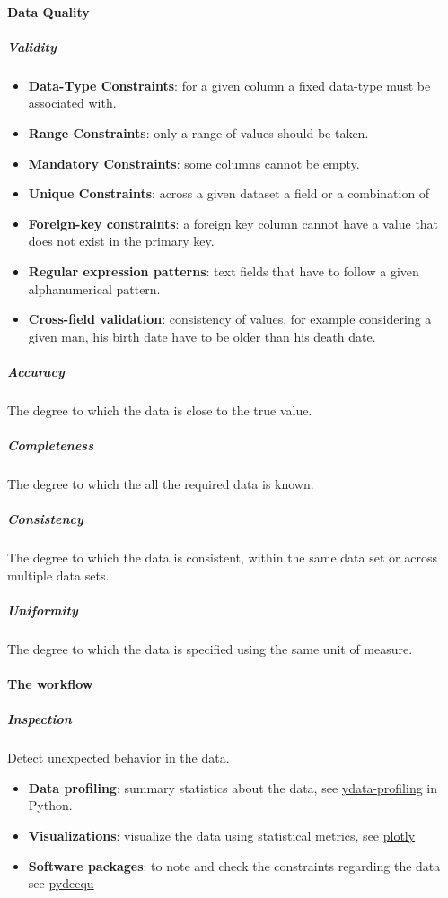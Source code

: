 \paragraph{Data Quality} 
\subparagraph{Validity}
\begin{itemize}
    \item \textbf{Data-Type Constraints}: for a given column a fixed data-type must be associated with.
    \item \textbf{Range Constraints}: only a range of values should be taken.
    \item \textbf{Mandatory Constraints}: some columns cannot be empty.
    \item \textbf{Unique Constraints}: across a given dataset a field or a combination of
    \item \textbf{Foreign-key constraints}: a foreign key column cannot have a value that
        does not exist in the primary key.
    \item \textbf{Regular expression patterns}: text fields that have to follow a given 
        alphanumerical pattern.
    \item \textbf{Cross-field validation}: consistency of values, for example considering
        a given man, his birth date have to be older than his death date.
\end{itemize}

\subparagraph{Accuracy}
The degree to which the data is close to the true value.
\cite{omar_elgabry_the_ultimate_guide_to_data_cleaning}

\subparagraph{Completeness}
The degree to which the all the required data is known.

\subparagraph{Consistency}
The degree to which the data is consistent, within the same data set or across multiple 
data sets.

\subparagraph{Uniformity}
The degree to which the data is specified using the same unit of measure.


\paragraph{The workflow}
\subparagraph{Inspection} 
Detect unexpected behavior in the data.
\begin{itemize}
    \item \textbf{Data profiling}: summary statistics about the data, see \href{https://github.com/ydataai/ydata-profiling}{ydata-profiling} in Python.
    \item \textbf{Visualizations}: visualize the data using statistical metrics, see
        \href{https://plotly.com/python/}{plotly}
    \item \textbf{Software packages}: to note and check the constraints regarding the data
        see \href{https://pypi.org/project/pydeequ/}{pydeequ}
\end{itemize}

